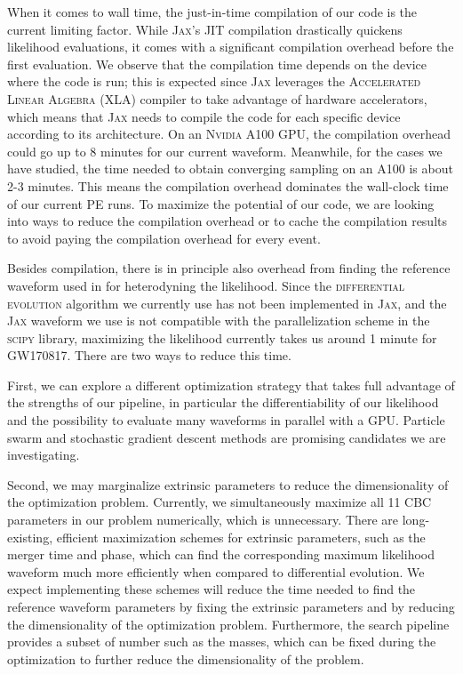 \documentclass[twocolumn]{aastex631}
\begin{document}
When it comes to wall time, the just-in-time compilation of our code is the
current limiting factor.  While \textsc{Jax}'s JIT compilation drastically
quickens likelihood evaluations, it comes with a significant compilation
overhead before the first evaluation. We observe that the compilation time
depends on the device where the code is run; this is expected since
\textsc{Jax} leverages the \textsc{Accelerated Linear Algebra} (XLA) compiler
to take advantage of hardware accelerators, which means that \textsc{Jax} needs
to compile the code for each specific device according to its architecture. On
an \textsc{Nvidia} A100 GPU, the compilation overhead could go up to 8 minutes
for our current waveform. Meanwhile, for the cases we have studied, the time
needed to obtain converging sampling on an A100 is about 2-3 minutes. This
means the compilation overhead dominates the wall-clock time of our current PE
runs. To maximize the potential of our code, we are looking into ways to reduce
the compilation overhead or to cache the compilation results to avoid paying
the compilation overhead for every event.

Besides compilation, there is in principle also overhead from finding the
reference waveform used in for heterodyning the likelihood. Since the
\textsc{differential evolution} algorithm we currently use has not been
implemented in \textsc{Jax}, and the \textsc{Jax} waveform we use is not
compatible with the parallelization scheme in the \textsc{scipy} library,
maximizing the likelihood currently takes us around 1 minute for GW170817. There
are two ways to reduce this time.

First, we can explore a different optimization strategy that
takes full advantage of the strengths of our pipeline, in particular the
differentiability of our likelihood and the possibility to evaluate many
waveforms in parallel with a GPU. Particle swarm \cite{7869491} and stochastic
gradient descent methods \cite{10.5555/304710.304720} are promising candidates
we are investigating.

Second, we may marginalize extrinsic parameters to reduce the dimensionality of
the optimization problem. Currently, we simultaneously maximize all 11 CBC
parameters in our problem numerically, which is unnecessary. There are
long-existing, efficient maximization schemes for extrinsic parameters, such as
the merger time and phase, which can find the corresponding maximum likelihood
waveform much more efficiently when compared to differential evolution. We
expect implementing these schemes will reduce the time needed to find the
reference waveform parameters by fixing the extrinsic parameters and by reducing
the dimensionality of the optimization problem. Furthermore, the search pipeline
provides a subset of number such as the masses, which can be fixed during the
optimization to further reduce the dimensionality of the problem.
\end{document}
